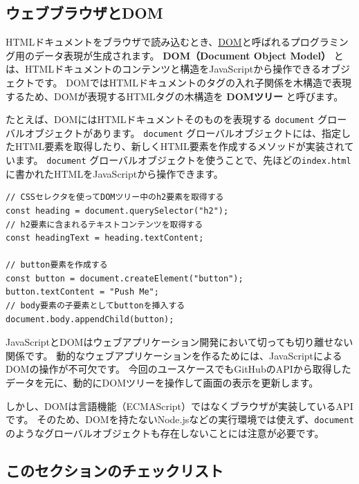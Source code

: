 \hypertarget{web-browsers-and-dom}{%
\subsection{ウェブブラウザとDOM}\label{web-browsers-and-dom}}

HTMLドキュメントをブラウザで読み込むとき、\href{https://developer.mozilla.org/ja/docs/Web/API/Document_Object_Model/Introduction}{DOM}と呼ばれるプログラミング用のデータ表現が生成されます。
\textbf{DOM（Document Object Model）}
とは、HTMLドキュメントのコンテンツと構造をJavaScriptから操作できるオブジェクトです。
DOMではHTMLドキュメントのタグの入れ子関係を木構造で表現するため、DOMが表現するHTMLタグの木構造を
\textbf{DOMツリー} と呼びます。

たとえば、DOMにはHTMLドキュメントそのものを表現する
\texttt{document} グローバルオブジェクトがあります。
\texttt{document}
グローバルオブジェクトには、指定したHTML要素を取得したり、新しくHTML要素を作成するメソッドが実装されています。
\texttt{document}
グローバルオブジェクトを使うことで、先ほどの\texttt{index.html}
に書かれたHTMLをJavaScriptから操作できます。

\begin{lstlisting}
// CSSセレクタを使ってDOMツリー中のh2要素を取得する
const heading = document.querySelector("h2");
// h2要素に含まれるテキストコンテンツを取得する
const headingText = heading.textContent;

// button要素を作成する
const button = document.createElement("button");
button.textContent = "Push Me";
// body要素の子要素としてbuttonを挿入する
document.body.appendChild(button);
\end{lstlisting}

JavaScriptとDOMはウェブアプリケーション開発において切っても切り離せない関係です。
動的なウェブアプリケーションを作るためには、JavaScriptによるDOMの操作が不可欠です。
今回のユースケースでもGitHubのAPIから取得したデータを元に、動的にDOMツリーを操作して画面の表示を更新します。

しかし、DOMは言語機能（ECMAScript）ではなくブラウザが実装しているAPIです。
そのため、DOMを持たないNode.jsなどの実行環境では使えず、\texttt{document}のようなグローバルオブジェクトも存在しないことには注意が必要です。

\hypertarget{section-checklist}{%
\subsection{このセクションのチェックリスト}\label{section-checklist}}

